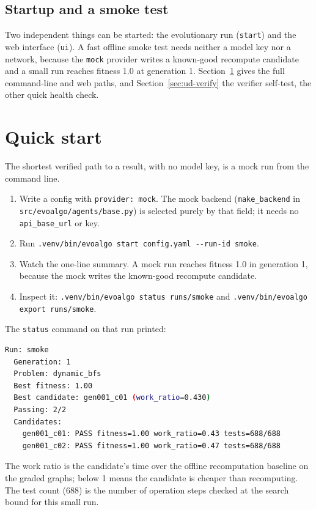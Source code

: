 \subsection{Startup and a smoke test}

Two independent things can be started: the evolutionary run (\texttt{start})
and the web interface (\texttt{ui}). A fast offline smoke test needs neither a
model key nor a network, because the \texttt{mock} provider writes a known-good
recompute candidate and a small run reaches fitness 1.0 at generation 1.
Section~\ref{sec:ud-quickstart} gives the full command-line and web paths, and
Section~\ref{sec:ud-verify} the verifier self-test, the other quick health check.

\section{Quick start}
\label{sec:ud-quickstart}

The shortest verified path to a result, with no model key, is a mock run from
the command line.

\begin{enumerate}
  \item Write a config with \texttt{provider: mock}. The mock backend
  (\texttt{make\_backend} in \texttt{src/evoalgo/agents/base.py}) is selected
  purely by that field; it needs no \texttt{api\_base\_url} or key.
  \item Run \texttt{.venv/bin/evoalgo start config.yaml -{}-run-id smoke}.
  \item Watch the one-line summary. A mock run reaches fitness 1.0 in
  generation 1, because the mock writes the known-good recompute candidate.
  \item Inspect it: \texttt{.venv/bin/evoalgo status runs/smoke} and
  \texttt{.venv/bin/evoalgo export runs/smoke}.
\end{enumerate}

The \texttt{status} command on that run printed:

\begin{lstlisting}[language=bash, basicstyle=\ttfamily\small]
Run: smoke
  Generation: 1
  Problem: dynamic_bfs
  Best fitness: 1.00
  Best candidate: gen001_c01 (work_ratio=0.430)
  Passing: 2/2
  Candidates:
    gen001_c01: PASS fitness=1.00 work_ratio=0.43 tests=688/688
    gen001_c02: PASS fitness=1.00 work_ratio=0.47 tests=688/688
\end{lstlisting}

The work ratio is the candidate's time over the offline recomputation baseline
on the graded graphs; below 1 means the candidate is cheaper than recomputing.
The test count (688) is the number of operation steps checked at the search
bound for this small run.

